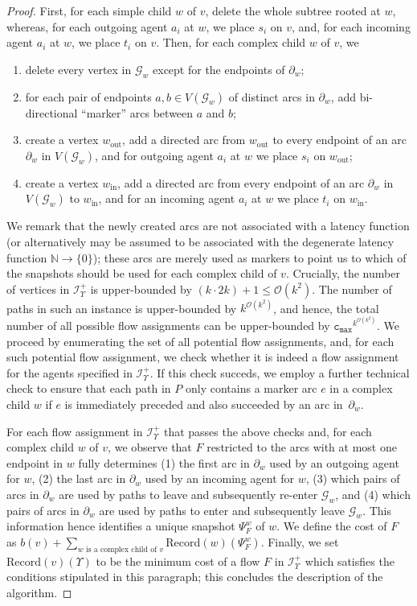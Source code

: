 \documentclass[letterpaper]{article} %
\newcommand{\bigoh}{\ensuremath{{\mathcal O}}}
\newcommand{\cmax}{\mathtt{c_{max}}}
\newcommand{\forgottenG}{\mathcal{G}}
\newcommand{\Rec}{\text{Record}}
\begin{document}
\begin{proof}
First, for each simple child $w$ of $v$, delete the whole subtree rooted at $w$, whereas, for each outgoing agent $a_i$ at $w$, we place $s_i$ on $v$, and, for each incoming agent $a_i$ at $w$, we place $t_i$ on $v$.
Then, for each complex child $w$ of $v$, we
\begin{enumerate}
\item delete every vertex in $\forgottenG_w$ except for the endpoints of $\partial_w$;
\item for each pair of endpoints $a,b\in V(\forgottenG_w)$ of distinct arcs in $\partial_w$, add bi-directional ``marker'' arcs between $a$ and $b$;
\item create a vertex $w_\text{out}$, add a directed arc from $w_\text{out}$ to every endpoint of an arc $\partial_w$ in $V(\forgottenG_w)$, and for outgoing agent $a_i$ at $w$ we place $s_i$ on $w_\text{out}$;
\item create a vertex $w_\text{in}$, add a directed arc from every endpoint of an arc $\partial_w$ in $V(\forgottenG_w)$ to $w_\text{in}$, and for an incoming agent $a_i$ at $w$ we place $t_i$ on $w_\text{in}$.
\end{enumerate}


We remark that the newly created arcs are not associated with a latency function (or alternatively may be assumed to be associated with the degenerate latency function $\mathbb{N}\rightarrow \{0\}$); these arcs are merely used as markers to point us to which of the snapshots should be used for each complex child of $v$. Crucially, the number of vertices in $\mathcal{I}^+_\Upsilon$ is upper-bounded by $(k\cdot 2k)+1\leq \bigoh(k^2)$. The number of paths in such an instance is upper-bounded by $k^{\bigoh(k^2)}$, and hence, the total number of all possible flow assignments can be upper-bounded by $\cmax^{k^{\bigoh(k^2)}}$. We proceed by enumerating the set of all potential flow assignments, and, for each such potential flow assignment, we check whether it is indeed a flow assignment for the agents specified in $\mathcal{I}^+_\Upsilon$. If this check succeds, we employ a further technical check to ensure that each path in $P$ only contains a marker arc $e$ in a complex child $w$ if $e$ is immediately preceded and also succeeded by an arc in~$\partial_w$. 

For each flow assignment in $\mathcal{I}^+_\Upsilon$ that passes the above checks and, for each complex child $w$ of $v$, we observe that $F$ restricted to the arcs with at most one endpoint in $w$ fully determines (1) the first arc in $\partial_w$ used by an outgoing agent for $w$, (2) the last arc in $\partial_w$ used by an incoming agent for $w$, (3) which pairs of arcs in $\partial_w$ are used by paths to leave and subsequently re-enter $\forgottenG_w$, and (4) which pairs of arcs in $\partial_w$ are used by paths to enter and subsequently leave $\forgottenG_w$. This information hence identifies a unique snapshot $\Psi^w_F$ of $w$. We define the cost of $F$ as $b(v)+\sum_{w\text{ is a complex child of }v}\Rec(w)(\Psi^w_F)$. Finally, we set $\Rec(v)(\Upsilon)$ to be the minimum cost of a flow $F$ in $\mathcal{I}^+_\Upsilon$ which satisfies the conditions stipulated in this paragraph; this concludes the description of the algorithm.


\end{proof}
\end{document}
